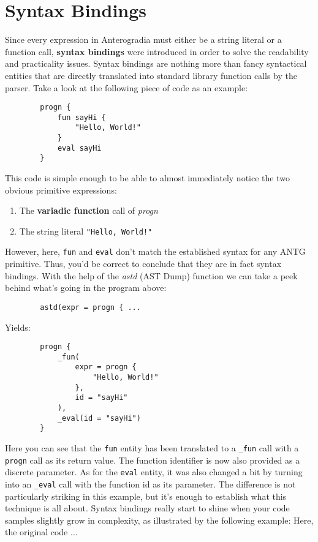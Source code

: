 \section{Syntax Bindings}
\begin{multicols*}{2}
	Since every expression in Anterogradia must either be a string literal or a function call, \textbf{syntax bindings} were
	introduced in order to solve the readability and practicality issues.
	Syntax bindings are nothing more than fancy syntactical entities that are directly translated into standard library function
	calls by the parser.
	Take a look at the following piece of code as an example:
	\begin{verbatim}
		progn {
		    fun sayHi {
		        "Hello, World!"
		    }
		    eval sayHi
		}
	\end{verbatim}
	This code is simple enough to be able to almost immediately notice the two obvious primitive expressions:
	\begin{enumerate}
		\item The \textbf{variadic function} call of \textit{progn}
		\item The string literal \verb|"Hello, World!"|
	\end{enumerate}
	However, here, \verb|fun| and \verb|eval| don't match the established syntax for any ANTG primitive.
	Thus, you'd be correct to conclude that they are in fact syntax bindings.
	With the help of the \textit{astd} (AST Dump) function we can take a peek behind what's going in the program above:
	\begin{verbatim}
		astd(expr = progn { ...
	\end{verbatim}
	Yields:
	\begin{verbatim}
		progn {
		    _fun(
		        expr = progn {
		            "Hello, World!"
		        },
		        id = "sayHi"
		    ),
		    _eval(id = "sayHi")
		}
	\end{verbatim}
	Here you can see that the \verb|fun| entity has been translated to a \verb|_fun| call with a \verb|progn| call as its
	return value.
	The function identifier is now also provided as a discrete parameter.
	As for the \verb|eval| entity, it was also changed a bit by turning into an \verb|_eval| call with the function id
	as its parameter.
	The difference is not particularly striking in this example, but it's enough to establish what this technique is all about.
	Syntax bindings really start to shine when your code samples slightly grow in complexity, as illustrated by the following example:
	\vfill\columnbreak\noindent
	Here, the original code $\dots$

\end{multicols*}
